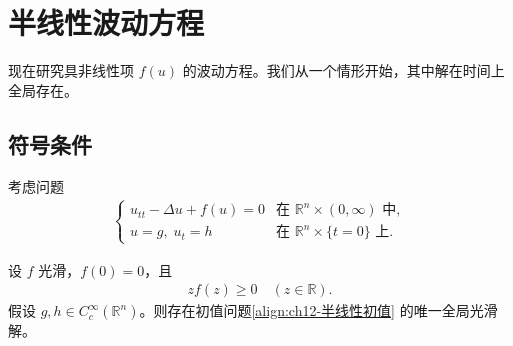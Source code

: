 \documentclass[../../main.tex]{subfiles}
\begin{document}
\section{半线性波动方程}\label{section:ch02-4-波动方程}

现在研究具非线性项 $f(u)$ 的波动方程。我们从一个情形开始，其中解在时间上全局存在。

\subsection{符号条件}\label{subsection:ch12-符号条件}

考虑问题
\begin{align}
\begin{cases}
u_{tt}-\Delta u+f(u)=0 & \text{在 } \mathbb{R}^n\times(0,\infty) \text{ 中},\\
u=g,\;u_t=h & \text{在 } \mathbb{R}^n\times\{t=0\} \text{ 上}.
\end{cases}
\label{align:ch12-半线性初值}
\end{align}

\begin{theorem}[符号条件下的全局存在性。]\label{theorem:ch12-符号条件全局存在}设 $f$ 光滑，$f(0)=0$，且
\begin{align}
zf(z)\geqslant 0 \quad (z\in\mathbb{R}).
\label{align:ch12-符号条件}
\end{align}
假设 $g,h\in C_c^\infty(\mathbb{R}^n)$。则存在初值问题\eqref{align:ch12-半线性初值} 的唯一全局光滑解。
\end{theorem}
\end{document}
